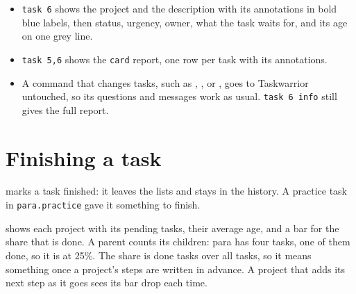 \documentclass[11pt,a4paper]{article}
\newlength{\taskcw}  %
\newcommand{\taskrule}[1]{{\ttfamily\scriptsize\setlength{\taskcw}{\fontcharwd\font`0}\textcolor{black!50}{\rule[0.55ex]{#1\taskcw}{0.5pt}}}}
\newcommand{\taskbar}[1]{{\ttfamily\scriptsize\setlength{\taskcw}{\fontcharwd\font`0}\textcolor{desc}{\rule[-0.3ex]{#1\taskcw}{1.6ex}}}}
\begin{document}
\begin{itemize}[nosep]
  \item \texttt{task 6} shows the project and the description with its annotations in bold blue labels, then status, urgency, owner, what the task waits for, and its age on one grey line.
  \item \texttt{task 5,6} shows the \texttt{card} report, one row per task with its annotations.
    \item A command that changes tasks, such as , , or , goes to Taskwarrior untouched, so its questions and messages work as usual. \texttt{task 6 info} still gives the full report.
\end{itemize}

\section*{Finishing a task}

 marks a task finished: it leaves the lists and stays in the history. A practice task in \texttt{para.practice} gave it something to finish.


 shows each project with its pending tasks, their average age, and a bar for the share that is done. A parent counts its children: para has four tasks, one of them done, so it is at 25\%. The share is done tasks over all tasks, so it means something once a project's steps are written in advance. A project that adds its next step as it goes sees its bar drop each time.
\end{document}
